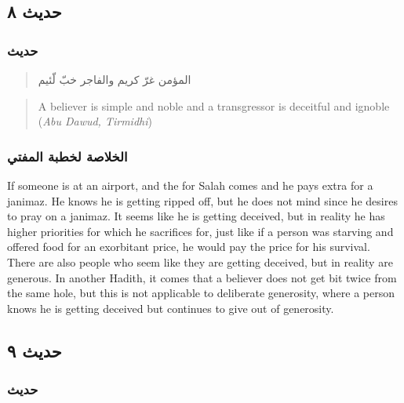 \documentclass[
]{book}
\begin{document}
\hypertarget{ux62dux62fux64aux62b-ux668}{%
\subsection{حديث ٨}\label{ux62dux62fux64aux62b-ux668}}

\hypertarget{ux62dux62fux64aux62b-7}{%
\subsubsection{حديث}\label{ux62dux62fux64aux62b-7}}

\begin{quote}
المؤمن غرّ كريم والفاجر خبّ لّئيم
\end{quote}

\begin{quote}
A believer is simple and noble and a transgressor is deceitful and ignoble (\emph{Abu Dawud, Tirmidhi})
\end{quote}

\hypertarget{ux627ux644ux62eux644ux627ux635ux629-ux644ux62eux637ux628ux629-ux627ux644ux645ux641ux62aux64a-7}{%
\subsubsection{الخلاصة لخطبة المفتي}\label{ux627ux644ux62eux644ux627ux635ux629-ux644ux62eux637ux628ux629-ux627ux644ux645ux641ux62aux64a-7}}

If someone is at an airport, and the for Salah comes and he pays extra for a janimaz. He knows he is getting ripped off, but he does not mind since he desires to pray on a janimaz. It seems like he is getting deceived, but in reality he has higher priorities for which he sacrifices for, just like if a person was starving and offered food for an exorbitant price, he would pay the price for his survival.\\
There are also people who seem like they are getting deceived, but in reality are generous. In another Hadith, it comes that a believer does not get bit twice from the same hole, but this is not applicable to deliberate generosity, where a person knows he is getting deceived but continues to give out of generosity.

\hypertarget{ux62dux62fux64aux62b-ux669}{%
\subsection{حديث ٩}\label{ux62dux62fux64aux62b-ux669}}

\hypertarget{ux62dux62fux64aux62b-8}{%
\subsubsection{حديث}\label{ux62dux62fux64aux62b-8}}
\end{document}
